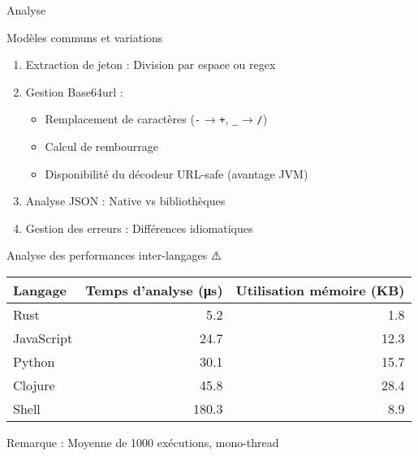 \documentclass[presentation,aspectratio=169]{beamer}
\begin{document}
\begin{frame}[label={sec:org68edeb1},fragile]{Analyse}
 \begin{block}{Modèles communs et variations 🧩}
\begin{enumerate}[<+->]
\item \alert{Extraction de jeton} : Division par espace ou regex
\item \alert{Gestion Base64url} :
\begin{itemize}
\item Remplacement de caractères (\texttt{-} → \texttt{+}, \texttt{\_} → \texttt{/})
\item Calcul de rembourrage
\item Disponibilité du décodeur URL-safe (avantage JVM)
\end{itemize}
\item \alert{Analyse JSON} : Native vs bibliothèques
\item \alert{Gestion des erreurs} : Différences idiomatiques
\end{enumerate}
\end{block}
\begin{block}{Analyse des performances inter-langages ⚠️}
\begin{center}
\begin{tabular}{lrr}
Langage & Temps d'analyse (μs) & Utilisation mémoire (KB)\\
\hline
Rust & 5.2 & 1.8\\
JavaScript & 24.7 & 12.3\\
Python & 30.1 & 15.7\\
Clojure & 45.8 & 28.4\\
Shell & 180.3 & 8.9\\
\end{tabular}
\end{center}

\alert{Remarque : Moyenne de 1000 exécutions, mono-thread}
\end{block}
\end{frame}
\end{document}
